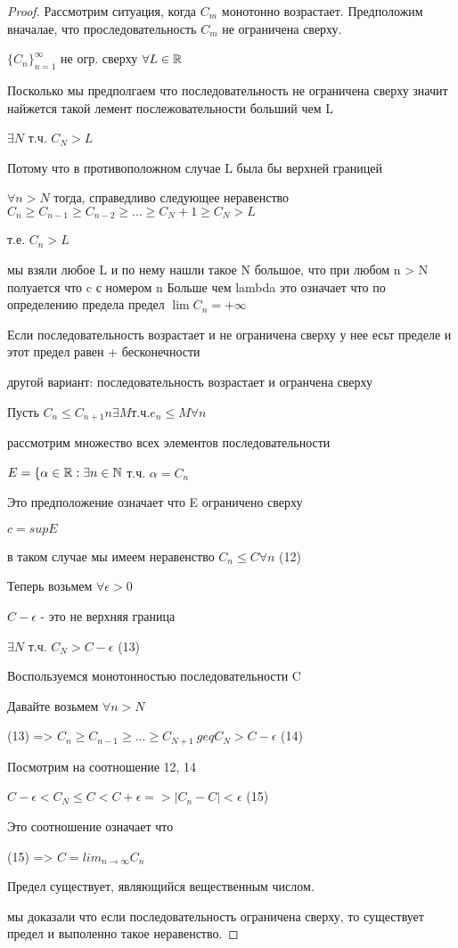 \begin{proof}

Рассмотрим ситуация, когда $C_m$ монотонно возрастает.
Предположим вначалае, что проследовательность $C_m$ не ограничена сверху.

$\{C_n\}_{n=1}^\infty$ не огр. сверху
$\forall L \in \mathbb{R}$

Посколько мы предполгаем что последовательность не ограничена сверху значит найжется такой 
лемент послежовательности больший чем L

$\exists N$ т.ч. $C_N > L$

Потому что в противоположном случае L была бы верхней границей


$\forall n > N$ тогда, справедливо следующее неравенство $C_n \geq C_{n-1} \geq C_{n-2} \geq ... \geq C_N + 1 \geq C_N > L$  

т.е. $C_n >L$

мы взяли любое L и по нему нашли такое N большое, что при любом n > N полуается что c с номером n Больше чем lambda
это означает что по определению предела предел
$\lim C_n = +\infty$

Если последовательность возрастает и не ограничена сверху у нее есьт пределе и этот предел равен + бесконечности


другой вариант:
последовательность возрастает и огранчена сверху 

Пусть $C_n \leq C_{n+1} n \exists M т.ч. e_n \leq M \forall n$

рассмотрим множество всех элементов последовательности

$E = \{\alpha \in \mathbb{R}: \exists n \in \mathbb{N}$ т.ч. $\alpha = C_n$


Это предположение означает что E ограничено сверху

$ c = sup E $

в таком случае мы имеем неравенство
$C_n \leq C \forall n$ (12) 

Теперь возьмем $\forall \epsilon > 0$

$C - \epsilon$ - это не верхняя граница

$\exists N$ т.ч. $C_N > C - \epsilon$ (13)

Воспользуемся монотонностью последовательности C

Давайте возьмем $\forall n > N$

(13) => $C_n \geq C_{n-1} \geq ... \geq C_{N + 1} \ geq C_N > C- \epsilon$ (14)

Посмотрим на соотношение 12, 14 

$C - \epsilon < C_N \leq C < C + \epsilon => |C_n - C| < \epsilon$ (15)

Это соотношение означает что

(15) => $C = lim_{n \to \infty} C_n$

Предел существует, являющийся вещественным числом.

мы доказали что если последовательность ограничена сверху, то существует предел и выполенно такое неравенство.


\end{proof}


